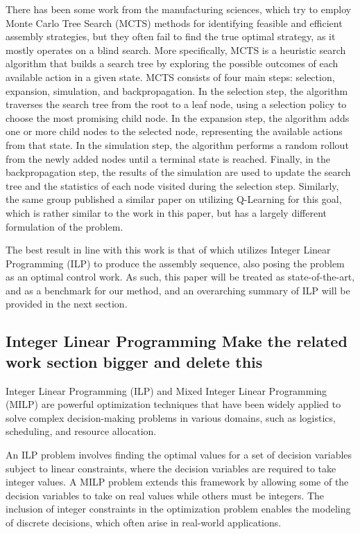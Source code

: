 \documentclass{article}
\begin{document}
There has been some work from the manufacturing sciences, which try to employ Monte Carlo Tree Search (MCTS) \citep{Giorgio2018a} methods for identifying feasible and efficient assembly strategies, but they often fail to find the true optimal strategy, as it mostly operates on a blind search. More specifically, MCTS is a heuristic search algorithm that builds a search tree by exploring the possible outcomes of each available action in a given state. MCTS consists of four main steps: selection, expansion, simulation, and backpropagation. In the selection step, the algorithm traverses the search tree from the root to a leaf node, using a selection policy to choose the most promising child node. In the expansion step, the algorithm adds one or more child nodes to the selected node, representing the available actions from that state. In the simulation step, the algorithm performs a random rollout from the newly added nodes until a terminal state is reached. Finally, in the backpropagation step, the results of the simulation are used to update the search tree and the statistics of each node visited during the selection step. Similarly, the same group published a similar paper on utilizing Q-Learning for this goal, which is rather similar to the work in this paper, but has a largely different formulation of the problem\citep{Giorgio2018}.

The best result in line with this work is that of \citep{Culbertson2019} which utilizes Integer Linear Programming (ILP) to produce the assembly sequence, also posing the problem as an optimal control work. As such, this paper will be treated as state-of-the-art, and as a benchmark for our method, and an overarching summary of ILP will be provided in the next section.

\subsection{Integer Linear Programming {\color{red} Make the related work section bigger and delete this}}
Integer Linear Programming (ILP) and Mixed Integer Linear Programming (MILP) are powerful optimization techniques that have been widely applied to solve complex decision-making problems in various domains, such as logistics, scheduling, and resource allocation. 

An ILP problem involves finding the optimal values for a set of decision variables subject to linear constraints, where the decision variables are required to take integer values. A MILP problem extends this framework by allowing some of the decision variables to take on real values while others must be integers. The inclusion of integer constraints in the optimization problem enables the modeling of discrete decisions, which often arise in real-world applications.
\end{document}
